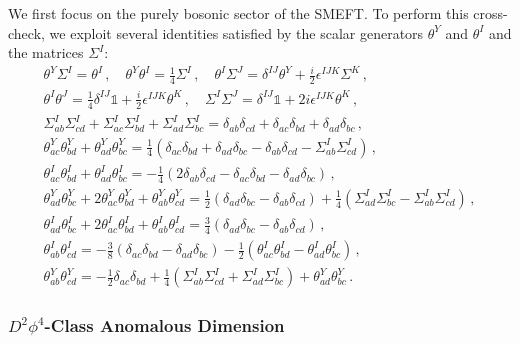 We first focus on the purely bosonic sector of the SMEFT.
%
To perform this cross-check, 
we exploit several identities satisfied by the scalar generators $\theta^Y$ and $\theta^I$ and the matrices $\Sigma^I$:
\begin{gather}
\theta^Y \Sigma^I = \theta^I\,, \quad
\theta^Y \theta^I = \frac{1}{4} \Sigma^I\,,\quad
\theta^I \Sigma^J = \delta^{IJ}\theta^Y+\frac{i}{2}\epsilon^{IJK}\Sigma^K\,,
\label{eq:matrixid1}\\
\theta^I \theta^J = \frac{1}{4}\delta^{IJ}\mathbb 1 + \frac{i}{2}\epsilon^{IJK}\theta^K\,,\quad
    \Sigma^I \Sigma^J = \delta^{IJ}\mathbb 1 + 2i \epsilon^{IJK}\theta^K\,,\label{eq:matrixid2}\\
    \Sigma_{ab}^I\Sigma^I_{cd}+\Sigma_{ac}^I\Sigma^I_{bd}+\Sigma_{ad}^I\Sigma^I_{bc} = \delta_{ab}\delta_{cd}+\delta_{ac}\delta_{bd}+\delta_{ad}\delta_{bc}\,, \label{eq:thetaI_thetaJ}\\
    \theta^Y_{ac}\theta^Y_{bd}+\theta^Y_{ad}\theta^Y_{bc}=
    \frac{1}{4} \left(\delta_{ac}\delta_{bd}+\delta_{ad}\delta_{bc}-\delta_{ab}\delta_{cd}-\Sigma_{ab}^I\Sigma^I_{cd}\right)\,, \\
    \theta^I_{ac}\theta^I_{bd}+\theta^I_{ad}\theta^I_{bc}=
    -\frac{1}{4}\left(2 \delta_{ab}\delta_{cd} - \delta_{ac}\delta_{bd}- \delta_{ad}\delta_{bc}\right)\,,\label{eq:thetaI_thetaI_permuted}\\
    \theta^Y_{ad}\theta^Y_{bc}+2\theta^Y_{ac}\theta^Y_{bd}+\theta^Y_{ab}\theta^Y_{cd}=\frac{1}{2}\left(\delta_{ad}\delta_{bc}-\delta_{ab}\delta_{cd}\right)+\frac{1}{4}\left(\Sigma^I_{ad}\Sigma^I_{bc}-\Sigma^I_{ab}\Sigma^I_{cd}\right) \,,\\
    \theta^I_{ad}\theta^I_{bc}+2\theta^I_{ac}\theta^I_{bd}+\theta^I_{ab}\theta^I_{cd} = \frac{3}{4} \left(\delta_{ad}\delta_{bc}-\delta_{ab}\delta_{cd}\right)\,,\\
    \theta^I_{ab}\theta^I_{cd} = -\frac{3}{8}(\delta_{ac}\delta_{bd}-\delta_{ad}\delta_{bc})-\frac{1}{2}(\theta^I_{ac}\theta^I_{bd}-\theta^I_{ad}\theta^I_{bc})\,,\\
    \theta^Y_{ab}\theta^Y_{cd} = -\frac{1}{2}\delta_{ac}\delta_{bd}+\frac{1}{4}\left(\Sigma^I_{ab}\Sigma^I_{cd}+\Sigma^I_{ad}\Sigma^I_{bc}\right)+\theta^Y_{ad}\theta^Y_{bc}\,.
\end{gather}

\subsubsection{\texorpdfstring{$D^2\phi^4$}{D2phi4}-Class Anomalous Dimension}

